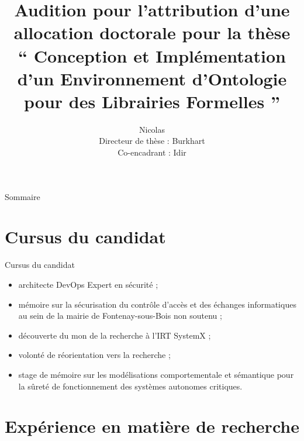 \documentclass[
  hyperref={
    pdfusetitle,
    pdfencoding=auto,
    psdextra,
    colorlinks=true,
    linkcolor=darkblue,
    citecolor=darkred,
    urlcolor=darkblue,
  },
  9pt,
  aspectratio=169,
]{beamer}
\title{%
  Audition pour l'attribution d'une allocation doctorale pour la thèse%
  \texorpdfstring{\\}{}
  \texorpdfstring{%
  \enquote{%
    Conception et Implémentation d'un Environnement d'Ontologie
    pour des Librairies Formelles%
  }%
  }{%
    Conception et Implémentation d'un Environnement d'Ontologie
    pour des Librairies Formelles%
  }%
}
\author{%
  {\Large Nicolas \texorpdfstring{\bsc{Méric}}{Méric}}%
  \texorpdfstring{\\}{}
  Directeur de thèse : Burkhart \texorpdfstring{\bsc{Wolff}}{Wolff}%
  \texorpdfstring{\\}{}
  Co-encadrant : Idir \texorpdfstring{\bsc{Ait Sadoune}}{Ait Sadoune}%
}
\date{\frenchdate{2020}{06}{11}}
\begin{document}

\begin{frame}
  \titlepage{}
\end{frame}

\begin{frame}{Sommaire}
  \tableofcontents[hideallsubsections]{}
\end{frame}

\section{Cursus du candidat}

\begin{frame}{Cursus du candidat}
  \begin{itemize}
    \item
      architecte DevOps \textendash{} Expert en sécurité ;
    \item
      mémoire sur la sécurisation
      du contrôle d'accès et des échanges informatiques
      au sein de la mairie de Fontenay-sous-Bois non soutenu ;
    \item
      découverte du mon de la recherche à l'\gls{IRT} SystemX ;
    \item
      volonté de réorientation vers la recherche ;
    \item
      stage de mémoire sur
      les modélisations comportementale et sémantique pour
      la sûreté de fonctionnement des systèmes autonomes critiques.
  \end{itemize}
\end{frame}

\section{Expérience en matière de recherche}
\end{document}
